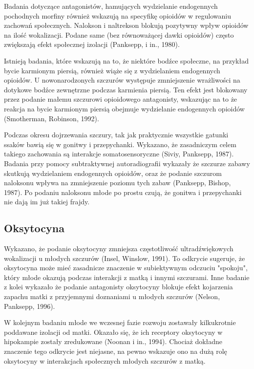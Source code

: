 \documentclass{psychol}
\begin{document}
Badania dotyczące antagonistów, hamujących wydzielanie endogennych pochodnych morfiny również wskazują na specyfikę opioidów w regulowaniu zachowań społecznych. Nalokson i naltrekson blokują pozytywny wpływ opioidów na ilość wokalizacji. Podane same (bez równoważącej dawki opioidów) często zwiększają efekt społecznej izolacji (Panksepp, i in., 1980).

Istnieją badania, które wskazują na to, że niektóre bodźce społeczne, na przykład bycie karmionym piersią, również wiąże się z wydzielaniem endogennych opioidów. U nowonarodzonych szczurów występuje zmniejszenie wrażliwości na dotykowe bodźce zewnętrzne podczas karmienia piersią. Ten efekt jest blokowany przez podanie małemu szczurowi opioidowego antagonisty, wskazując na to że reakcja na bycie karmionym piersią obejmuje wydzielanie endogennych opioidów (Smotherman, Robinson, 1992).

Podczas okresu dojrzewania szczury, tak jak praktycznie wszystkie gatunki ssaków bawią się w gonitwy i przepychanki. Wykazano, że zasadniczym celem takiego zachowania są interakcje somatosensoryczne (Siviy, Panksepp, 1987). Badania przy pomocy subtraktywnej autoradiografii wykazały że szczurze zabawy skutkują wydzielaniem endogennych opioidów, oraz że podanie szczurom naloksonu wpływa na zmniejszenie poziomu tych zabaw (Panksepp, Bishop, 1987).  Po podaniu naloksonu młode po prostu czują, że gonitwa i przepychanki nie dają im już takiej frajdy.

\subsection{Oksytocyna}

Wykazano, że podanie oksytocyny zmniejsza częstotliwość ultradźwiękowych wokalizacji u młodych szczurów (Insel, Winslow, 1991). To odkrycie sugeruje, że oksytocyna może mieć zasadnicze znaczenie w subiektywnym odczuciu "spokoju", który młode okazują podczas interakcji z matką i innymi szczurami. Inne badanie z kolei wykazało że podanie antagonisty oksytocyny blokuje efekt kojarzenia zapachu matki z przyjemnymi doznaniami u młodych szczurów (Nelson, Panksepp, 1996).

W kolejnym badaniu młode we wczesnej fazie rozwoju zostawały kilkukrotnie poddawane izolacji od matki. Okazało się, że ich receptory oksytocyny w hipokampie zostały zredukowane \colorbox{yellow!30}{(Noonan i in., 1994)}. Chociaż dokładne znaczenie tego odkrycie jest niejasne, na pewno wskazuje ono na dużą rolę oksytocyny w interakcjach społecznych młodych szczurów z matką.
\end{document}
